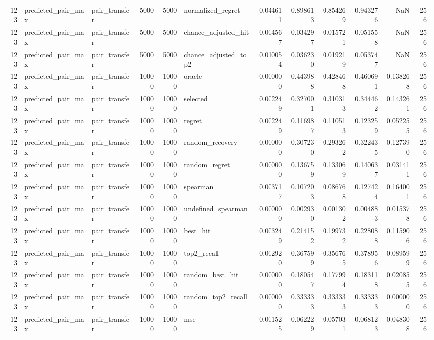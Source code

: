 \begin{tabular}{rllrrlrrrrrr}
123 & predicted_pair_max & pair_transfer & 5000 & 5000 & normalized_regret & 0.044611 & 0.898613 & 0.854269 & 0.943276 & NaN & 256 \\
123 & predicted_pair_max & pair_transfer & 5000 & 5000 & chance_adjusted_hit & 0.004567 & 0.034297 & 0.015721 & 0.051558 & NaN & 256 \\
123 & predicted_pair_max & pair_transfer & 5000 & 5000 & chance_adjusted_top2 & 0.010054 & 0.036230 & 0.019219 & 0.053747 & NaN & 256 \\
123 & predicted_pair_max & pair_transfer & 10000 & 10000 & oracle & 0.000000 & 0.443988 & 0.428468 & 0.460691 & 0.138268 & 256 \\
123 & predicted_pair_max & pair_transfer & 10000 & 10000 & selected & 0.002249 & 0.327001 & 0.310313 & 0.344462 & 0.143261 & 256 \\
123 & predicted_pair_max & pair_transfer & 10000 & 10000 & regret & 0.002249 & 0.116987 & 0.110513 & 0.123259 & 0.052255 & 256 \\
123 & predicted_pair_max & pair_transfer & 10000 & 10000 & random_recovery & 0.000000 & 0.307230 & 0.293262 & 0.322435 & 0.127390 & 256 \\
123 & predicted_pair_max & pair_transfer & 10000 & 10000 & random_regret & 0.000000 & 0.136759 & 0.133069 & 0.140637 & 0.031411 & 256 \\
123 & predicted_pair_max & pair_transfer & 10000 & 10000 & spearman & 0.003717 & 0.107203 & 0.086768 & 0.127424 & 0.164001 & 256 \\
123 & predicted_pair_max & pair_transfer & 10000 & 10000 & undefined_spearman & 0.000000 & 0.002930 & 0.001302 & 0.004883 & 0.015378 & 256 \\
123 & predicted_pair_max & pair_transfer & 10000 & 10000 & best_hit & 0.003249 & 0.214152 & 0.199732 & 0.228088 & 0.115906 & 256 \\
123 & predicted_pair_max & pair_transfer & 10000 & 10000 & top2_recall & 0.002920 & 0.367599 & 0.356765 & 0.378956 & 0.089599 & 256 \\
123 & predicted_pair_max & pair_transfer & 10000 & 10000 & random_best_hit & 0.000000 & 0.180547 & 0.177994 & 0.183118 & 0.020855 & 256 \\
123 & predicted_pair_max & pair_transfer & 10000 & 10000 & random_top2_recall & 0.000000 & 0.333333 & 0.333333 & 0.333333 & 0.000000 & 256 \\
123 & predicted_pair_max & pair_transfer & 10000 & 10000 & mse & 0.001525 & 0.062229 & 0.057031 & 0.068123 & 0.048308 & 256 \\

\end{tabular}
